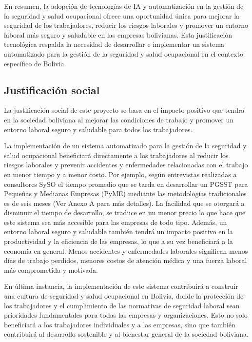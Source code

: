 En resumen, la adopción de tecnologías de IA y automatización en la gestión de la seguridad y salud ocupacional ofrece una oportunidad única para mejorar la seguridad de los trabajadores, reducir los riesgos laborales y promover un entorno laboral más seguro y saludable en las empresas bolivianas. Esta justificación tecnológica respalda la necesidad de desarrollar e implementar un sistema automatizado para la gestión de la seguridad y salud ocupacional en el contexto específico de Bolivia.

\subsection{Justificación social}

La justificación social de este proyecto se basa en el impacto positivo que tendrá en la sociedad boliviana al mejorar las condiciones de trabajo y promover un entorno laboral seguro y saludable para todos los trabajadores.

La implementación de un sistema automatizado para la gestión de la seguridad y salud ocupacional beneficiará directamente a los trabajadores al reducir los riesgos laborales y prevenir accidentes y enfermedades relacionadas con el trabajo en menor tiempo y a menor costo. Por ejemplo, según entrevistas realizadas a consultores SySO el tiempo promedio que se tarda en desarrollar un PGSST para Pequeñas y Medianas Empresas (PyME) mediante las metodologías tradicionales es de seis meses (Ver Anexo A para más detalles). La facilidad que se otorgará a disminuir el tiempo de desarrollo, se traduce en un menor precio lo que hace que este sistema sea más accesible para las empresas de todo tipo. Además, un entorno laboral seguro y saludable también tendrá un impacto positivo en la productividad y la eficiencia de las empresas, lo que a su vez beneficiará a la economía en general. Menos accidentes y enfermedades laborales significan menos días de trabajo perdidos, menores costos de atención médica y una fuerza laboral más comprometida y motivada.

En última instancia, la implementación de este sistema contribuirá a construir una cultura de seguridad y salud ocupacional en Bolivia, donde la protección de los trabajadores y el cumplimiento de las normativas de seguridad laboral sean prioridades fundamentales para todas las empresas y organizaciones. Esto no solo beneficiará a los trabajadores individuales y a las empresas, sino que también contribuirá al desarrollo sostenible y al bienestar general de la sociedad boliviana.

